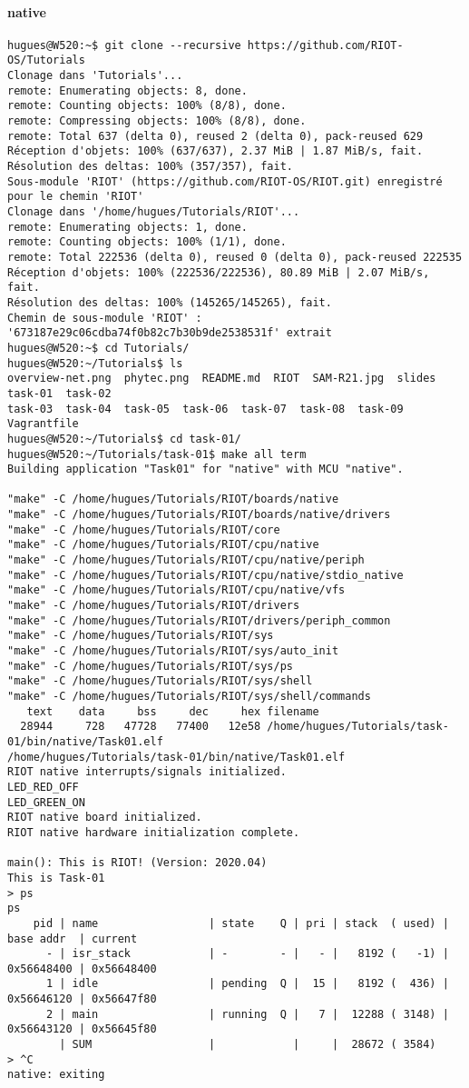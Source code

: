\paragraph{native}
{\footnotesize
\begin{verbatim}
hugues@W520:~$ git clone --recursive https://github.com/RIOT-OS/Tutorials
Clonage dans 'Tutorials'...
remote: Enumerating objects: 8, done.
remote: Counting objects: 100% (8/8), done.
remote: Compressing objects: 100% (8/8), done.
remote: Total 637 (delta 0), reused 2 (delta 0), pack-reused 629
Réception d'objets: 100% (637/637), 2.37 MiB | 1.87 MiB/s, fait.
Résolution des deltas: 100% (357/357), fait.
Sous-module 'RIOT' (https://github.com/RIOT-OS/RIOT.git) enregistré pour le chemin 'RIOT'
Clonage dans '/home/hugues/Tutorials/RIOT'...
remote: Enumerating objects: 1, done.        
remote: Counting objects: 100% (1/1), done.        
remote: Total 222536 (delta 0), reused 0 (delta 0), pack-reused 222535        
Réception d'objets: 100% (222536/222536), 80.89 MiB | 2.07 MiB/s, fait.
Résolution des deltas: 100% (145265/145265), fait.
Chemin de sous-module 'RIOT' : '673187e29c06cdba74f0b82c7b30b9de2538531f' extrait
hugues@W520:~$ cd Tutorials/
hugues@W520:~/Tutorials$ ls
overview-net.png  phytec.png  README.md  RIOT  SAM-R21.jpg  slides  task-01  task-02
task-03  task-04  task-05  task-06  task-07  task-08  task-09  Vagrantfile
hugues@W520:~/Tutorials$ cd task-01/
hugues@W520:~/Tutorials/task-01$ make all term
Building application "Task01" for "native" with MCU "native".

"make" -C /home/hugues/Tutorials/RIOT/boards/native
"make" -C /home/hugues/Tutorials/RIOT/boards/native/drivers
"make" -C /home/hugues/Tutorials/RIOT/core
"make" -C /home/hugues/Tutorials/RIOT/cpu/native
"make" -C /home/hugues/Tutorials/RIOT/cpu/native/periph
"make" -C /home/hugues/Tutorials/RIOT/cpu/native/stdio_native
"make" -C /home/hugues/Tutorials/RIOT/cpu/native/vfs
"make" -C /home/hugues/Tutorials/RIOT/drivers
"make" -C /home/hugues/Tutorials/RIOT/drivers/periph_common
"make" -C /home/hugues/Tutorials/RIOT/sys
"make" -C /home/hugues/Tutorials/RIOT/sys/auto_init
"make" -C /home/hugues/Tutorials/RIOT/sys/ps
"make" -C /home/hugues/Tutorials/RIOT/sys/shell
"make" -C /home/hugues/Tutorials/RIOT/sys/shell/commands
   text	   data	    bss	    dec	    hex	filename
  28944	    728	  47728	  77400	  12e58	/home/hugues/Tutorials/task-01/bin/native/Task01.elf
/home/hugues/Tutorials/task-01/bin/native/Task01.elf  
RIOT native interrupts/signals initialized.
LED_RED_OFF
LED_GREEN_ON
RIOT native board initialized.
RIOT native hardware initialization complete.

main(): This is RIOT! (Version: 2020.04)
This is Task-01
> ps
ps
	pid | name                 | state    Q | pri | stack  ( used) | base addr  | current     
	  - | isr_stack            | -        - |   - |   8192 (   -1) | 0x56648400 | 0x56648400
	  1 | idle                 | pending  Q |  15 |   8192 (  436) | 0x56646120 | 0x56647f80 
	  2 | main                 | running  Q |   7 |  12288 ( 3148) | 0x56643120 | 0x56645f80 
	    | SUM                  |            |     |  28672 ( 3584)
> ^C
native: exiting
\end{verbatim}
}

